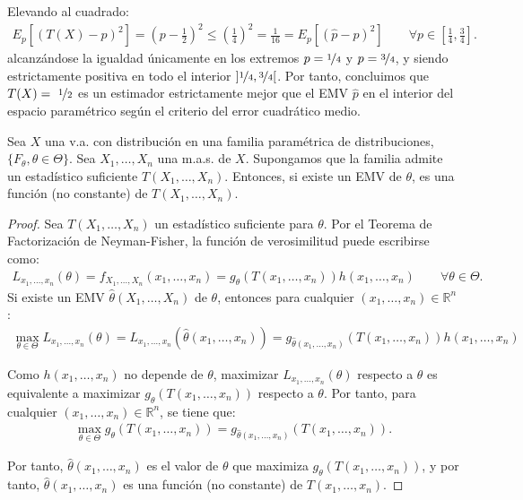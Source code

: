 \begin{ejemplo}
    Elevando al cuadrado:
    \begin{align*}
        E_p[(T(X) - p)^2] = \left(p - \frac{1}{2}\right)^2 \le \left(\frac{1}{4}\right)^2 = \frac{1}{16} = E_p[(\hat{p} - p)^2] \qquad \forall p \in \left[\frac{1}{4}, \frac{3}{4}\right].
    \end{align*}
    alcanzándose la igualdad únicamente en los extremos $p = \nicefrac{1}{4}$ y $p = \nicefrac{3}{4}$, y siendo estrictamente positiva en todo el interior $\left]\nicefrac{1}{4}, \nicefrac{3}{4}\right[$. Por tanto, concluimos que $T(X)=~\nicefrac{1}{2}$ es un estimador estrictamente mejor que el EMV $\hat{p}$ en el interior del espacio paramétrico según el criterio del error cuadrático medio.
\end{ejemplo}

\begin{teo}
    Sea $X$ una v.a. con distribución en una familia paramétrica de distribuciones, $\{F_\theta, \theta \in \Theta\}$. Sea $X_1, \ldots, X_n$ una m.a.s. de $X$. Supongamos que la familia admite un estadístico suficiente $T(X_1, \ldots, X_n)$. Entonces, si existe un EMV de $\theta$, es una función (no constante) de $T(X_1, \ldots, X_n)$.
\end{teo}
\begin{proof}
    Sea $T(X_1, \ldots, X_n)$ un estadístico suficiente para $\theta$. Por el Teorema de Factorización de Neyman-Fisher, la función de verosimilitud puede escribirse como:
    \begin{align*}
        L_{x_1, \ldots, x_n}(\theta) = f_{X_1, \ldots, X_n}(x_1, \ldots, x_n) = g_\theta(T(x_1, \ldots, x_n))h(x_1, \ldots, x_n) \qquad \forall \theta \in \Theta.
    \end{align*}
    Si existe un EMV $\hat{\theta}(X_1, \ldots, X_n)$ de $\theta$, entonces para cualquier $(x_1, \ldots, x_n) \in \mathbb{R}^n$:
    \begin{align*}
        \max_{\theta \in \Theta} L_{x_1, \ldots, x_n}(\theta) = L_{x_1, \ldots, x_n}(\hat{\theta}(x_1, \ldots, x_n)) = g_{\hat{\theta}(x_1, \ldots, x_n)}(T(x_1, \ldots, x_n))h(x_1, \ldots, x_n)
    \end{align*}
    
    Como $h(x_1, \ldots, x_n)$ no depende de $\theta$, maximizar $L_{x_1, \ldots, x_n}(\theta)$ respecto a $\theta$ es equivalente a maximizar $g_\theta(T(x_1, \ldots, x_n))$ respecto a $\theta$. Por tanto, para cualquier $(x_1, \ldots, x_n) \in \mathbb{R}^n$, se tiene que:
    \begin{align*}
        \max_{\theta \in \Theta} g_\theta(T(x_1, \ldots, x_n)) = g_{\hat{\theta}(x_1, \ldots, x_n)}(T(x_1, \ldots, x_n)).
    \end{align*}

    Por tanto, $\hat{\theta}(x_1, \ldots, x_n)$ es el valor de $\theta$ que maximiza $g_\theta(T(x_1, \ldots, x_n))$, y por tanto, $\hat{\theta}(x_1, \ldots, x_n)$ es una función (no constante) de $T(x_1, \ldots, x_n)$.    
\end{proof}

